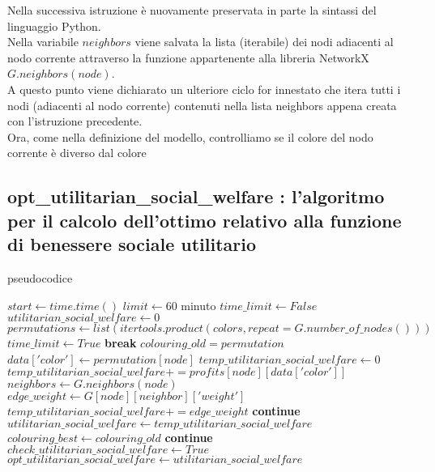 Nella successiva istruzione è nuovamente preservata in parte la sintassi del linguaggio Python.\\
Nella variabile $neighbors$ viene salvata la lista (iterabile) dei nodi adiacenti al nodo corrente attraverso la funzione appartenente alla libreria NetworkX $G.neighbors(node)$.\\

A questo punto viene dichiarato un ulteriore ciclo for innestato che itera tutti i nodi (adiacenti al nodo corrente) contenuti nella lista neighbors appena creata con l'istruzione precedente.\\

Ora, come nella definizione del modello, controlliamo se il colore del nodo corrente è diverso dal colore 

\newpage
\subsection{opt\_utilitarian\_social\_welfare : l'algoritmo per il calcolo dell'ottimo relativo alla funzione di benessere sociale utilitario}
\justify
pseudocodice \\

\begin{algorithmic}

\State $start\gets time.time()$
\State $limit\gets 60$  minuto
\State $time\_limit\gets False$ \\

\State $utilitarian\_social\_welfare\gets 0$
\State $permutations\gets list(itertools.product(colors, repeat=G.number\_of\_nodes()))$ \\

		\State $time\_limit\gets True$ 
		\State \textbf{break}
	\EndIf
	\State $colouring\_old = permutation$
		\State $data['color']\gets permutation[node]$
	\EndFor
	\State $temp\_utilitarian\_social\_welfare\gets 0$
		\State $temp\_utilitarian\_social\_welfare += profits[node][data['color']]$
		\State $neighbors\gets G.neighbors(node)$
				\State $edge\_weight\gets G[node][neighbor]['weight']$
				\State $temp\_utilitarian\_social\_welfare += edge\_weight$
			\Else
				\State \textbf{continue}
			\EndIf
		\EndFor
	\EndFor
		\State $utilitarian\_social\_welfare\gets temp\_utilitarian\_social\_welfare$
		\State $colouring\_best\gets colouring\_old$
	\Else
		\State \textbf{continue}
	\EndIf
\EndFor \\

	\State $check\_utilitarian\_social\_welfare\gets True$
	\State $opt\_utilitarian\_social\_welfare\gets utilitarian\_social\_welfare$
\EndIf

\end{algorithmic} 

